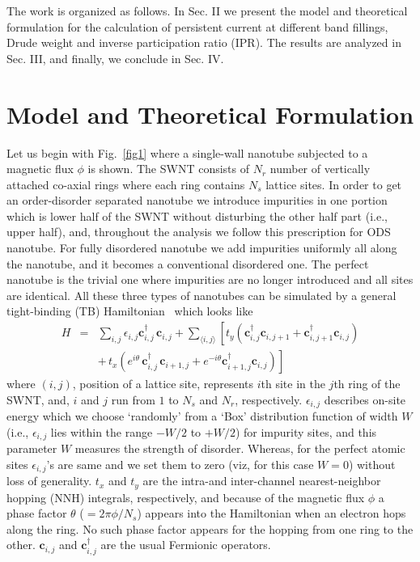 \documentclass[prb,aps,twocolumn,amsmath,amssymb,floatfix,
superscriptaddress]{revtex4}
\begin{document}
The work is organized as follows. In Sec. II we present the model and 
theoretical formulation for the calculation of persistent current at 
different band fillings, Drude weight and inverse participation ratio (IPR). 
The results are analyzed in Sec. III, and finally, we conclude in Sec. IV.

\section{Model and Theoretical Formulation}

Let us begin with Fig.~\ref{fig1} where a single-wall nanotube
subjected to a magnetic flux $\phi$ is shown. The SWNT consists of $N_r$ 
number of vertically attached co-axial rings where each ring contains 
$N_s$ lattice sites. In order to get an order-disorder separated nanotube
we introduce impurities in one portion which is lower half of the SWNT 
without disturbing the other half part (i.e., upper half), and, throughout 
the analysis we follow this prescription for ODS nanotube. For fully 
disordered nanotube we add impurities uniformly all along the nanotube,
and it becomes a conventional disordered one. The perfect nanotube is the
trivial one where impurities are no longer introduced and all sites are
identical. All these three types of nanotubes can be simulated by a general 
tight-binding (TB) Hamiltonian~\cite{pc2} which looks like
\begin{eqnarray}
H & = &  \sum_{i,j} \epsilon_{i,j} \textbf{c}^\dagger_{i,j}\, 
\textbf{c}_{i,j} + \sum_{\langle i,j \rangle} 
\left[t_y (\textbf{c}^\dagger_{i,j} \textbf{c}_{i,j+1} +
 \textbf{c}^\dagger_{i,j+1} \textbf{c}_{i,j})
 \right. 
\nonumber \\
&& \left. + \, t_x  (e^{i\theta} \, \textbf{c}^\dagger_{i,j}\,
\textbf{c}_{i+1,j} + e^{-i\theta} \textbf{c}^\dagger_{i+1,j} 
\textbf{c}_{i,j})\right]
\label{eq1}
\end{eqnarray}
where $(i,j)$, position of a lattice site, represents $i$th site in the 
$j$th ring of the SWNT, and, $i$ and $j$ run from $1$ to $N_s$ and $N_r$, 
respectively. $\epsilon_{i,j}$ describes on-site energy which we choose 
`randomly' from a `Box' distribution function of width $W$ (i.e., 
$\epsilon_{i,j}$ lies within the range $-W/2$ to $+W/2$) for impurity sites, 
and this parameter $W$ measures the strength of disorder. Whereas, for the
perfect atomic sites $\epsilon_{i,j}$'s are same and we set them to zero 
(viz, for this case $W=0$) without loss of generality. $t_x$ and $t_y$ are the 
intra-and inter-channel nearest-neighbor hopping (NNH) integrals, respectively,
and because of the magnetic flux $\phi$ a phase factor $\theta$ 
($= 2\pi \phi /N_s$) appears into the Hamiltonian when an electron hops 
along the ring. No such phase factor appears for the hopping from one
ring to the other. $\textbf{c}_{i,j}$ and $\textbf{c}^\dagger_{i,j}$ are
the usual Fermionic operators.
\end{document}
